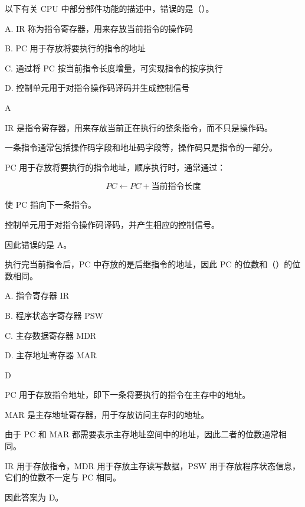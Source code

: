 \begin{question}
以下有关 CPU 中部分部件功能的描述中，错误的是（）。

A. IR 称为指令寄存器，用来存放当前指令的操作码

B. PC 用于存放将要执行的指令的地址

C. 通过将 PC 按当前指令长度增量，可实现指令的按序执行

D. 控制单元用于对指令操作码译码并生成控制信号
\end{question}

\begin{answer}
A
\end{answer}

\begin{analysisenv}
IR 是指令寄存器，用来存放当前正在执行的整条指令，而不只是操作码。

一条指令通常包括操作码字段和地址码字段等，操作码只是指令的一部分。

PC 用于存放将要执行的指令地址，顺序执行时，通常通过：

\[
PC \leftarrow PC + \text{当前指令长度}
\]

使 PC 指向下一条指令。

控制单元用于对指令操作码译码，并产生相应的控制信号。

因此错误的是 A。
\end{analysisenv}


\begin{question}
执行完当前指令后，PC 中存放的是后继指令的地址，因此 PC 的位数和（）的位数相同。

A. 指令寄存器 IR

B. 程序状态字寄存器 PSW

C. 主存数据寄存器 MDR

D. 主存地址寄存器 MAR
\end{question}

\begin{answer}
D
\end{answer}

\begin{analysisenv}
PC 用于存放指令地址，即下一条将要执行的指令在主存中的地址。

MAR 是主存地址寄存器，用于存放访问主存时的地址。

由于 PC 和 MAR 都需要表示主存地址空间中的地址，因此二者的位数通常相同。

IR 用于存放指令，MDR 用于存放主存读写数据，PSW 用于存放程序状态信息，它们的位数不一定与 PC 相同。

因此答案为 D。

\end{analysisenv}


